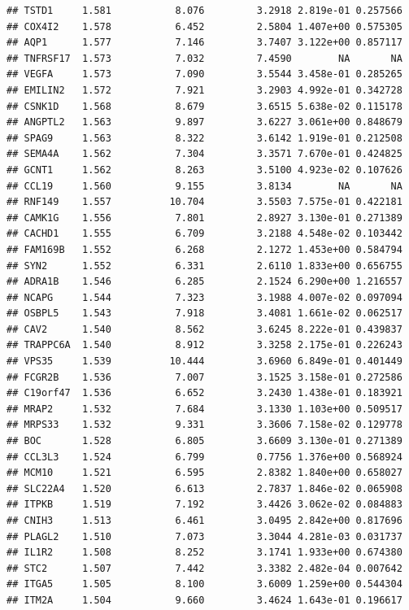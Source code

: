 \documentclass{article}\usepackage[]{graphicx}\usepackage[]{color}
\makeatletter
\newenvironment{kframe}{%
 \def\at@end@of@kframe{}%
 \ifinner\ifhmode%
  \def\at@end@of@kframe{\end{minipage}}%
  \begin{minipage}{\columnwidth}%
 \fi\fi%
 \def\FrameCommand##1{\hskip\@totalleftmargin \hskip-\fboxsep
 \colorbox{shadecolor}{##1}\hskip-\fboxsep
     \hskip-\linewidth \hskip-\@totalleftmargin \hskip\columnwidth}%
 \MakeFramed {\advance\hsize-\width
   \@totalleftmargin\z@ \linewidth\hsize
   \@setminipage}}%
 {\par\unskip\endMakeFramed%
 \at@end@of@kframe}
\newenvironment{knitrout}{}{} %
\makeatother
\begin{document}
\begin{knitrout}
\begin{kframe}
\begin{verbatim}
## TSTD1     1.581           8.076         3.2918 2.819e-01 0.257566
## COX4I2    1.578           6.452         2.5804 1.407e+00 0.575305
## AQP1      1.577           7.146         3.7407 3.122e+00 0.857117
## TNFRSF17  1.573           7.032         7.4590        NA       NA
## VEGFA     1.573           7.090         3.5544 3.458e-01 0.285265
## EMILIN2   1.572           7.921         3.2903 4.992e-01 0.342728
## CSNK1D    1.568           8.679         3.6515 5.638e-02 0.115178
## ANGPTL2   1.563           9.897         3.6227 3.061e+00 0.848679
## SPAG9     1.563           8.322         3.6142 1.919e-01 0.212508
## SEMA4A    1.562           7.304         3.3571 7.670e-01 0.424825
## GCNT1     1.562           8.263         3.5100 4.923e-02 0.107626
## CCL19     1.560           9.155         3.8134        NA       NA
## RNF149    1.557          10.704         3.5503 7.575e-01 0.422181
## CAMK1G    1.556           7.801         2.8927 3.130e-01 0.271389
## CACHD1    1.555           6.709         3.2188 4.548e-02 0.103442
## FAM169B   1.552           6.268         2.1272 1.453e+00 0.584794
## SYN2      1.552           6.331         2.6110 1.833e+00 0.656755
## ADRA1B    1.546           6.285         2.1524 6.290e+00 1.216557
## NCAPG     1.544           7.323         3.1988 4.007e-02 0.097094
## OSBPL5    1.543           7.918         3.4081 1.661e-02 0.062517
## CAV2      1.540           8.562         3.6245 8.222e-01 0.439837
## TRAPPC6A  1.540           8.912         3.3258 2.175e-01 0.226243
## VPS35     1.539          10.444         3.6960 6.849e-01 0.401449
## FCGR2B    1.536           7.007         3.1525 3.158e-01 0.272586
## C19orf47  1.536           6.652         3.2430 1.438e-01 0.183921
## MRAP2     1.532           7.684         3.1330 1.103e+00 0.509517
## MRPS33    1.532           9.331         3.3606 7.158e-02 0.129778
## BOC       1.528           6.805         3.6609 3.130e-01 0.271389
## CCL3L3    1.524           6.799         0.7756 1.376e+00 0.568924
## MCM10     1.521           6.595         2.8382 1.840e+00 0.658027
## SLC22A4   1.520           6.613         2.7837 1.846e-02 0.065908
## ITPKB     1.519           7.192         3.4426 3.062e-02 0.084883
## CNIH3     1.513           6.461         3.0495 2.842e+00 0.817696
## PLAGL2    1.510           7.073         3.3044 4.281e-03 0.031737
## IL1R2     1.508           8.252         3.1741 1.933e+00 0.674380
## STC2      1.507           7.442         3.3382 2.482e-04 0.007642
## ITGA5     1.505           8.100         3.6009 1.259e+00 0.544304
## ITM2A     1.504           9.660         3.4624 1.643e-01 0.196617

\end{verbatim}
\end{kframe}
\end{knitrout}
\end{document}
